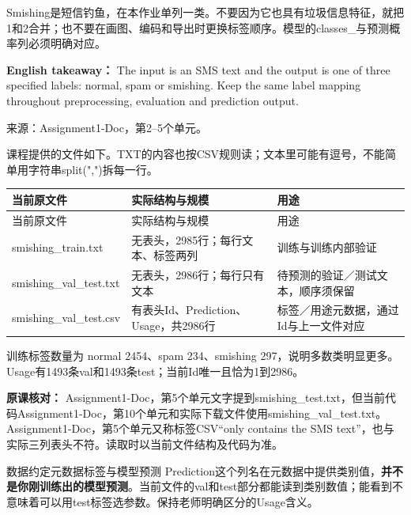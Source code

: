 Smishing是短信钓鱼，在本作业单列一类。不要因为它也具有垃圾信息特征，就把1和2合并；也不要在画图、编码和导出时更换标签顺序。模型的classes\_与预测概率列必须明确对应。


\textbf{English takeaway：} The input is an SMS text and the output is one of three specified labels: normal, spam or smishing. Keep the same label mapping throughout preprocessing, evaluation and prediction output.


来源：Assignment1-Doc，第2–5个单元。








课程提供的文件如下。TXT的内容也按CSV规则读；文本里可能有逗号，不能简单用字符串split(",")拆每一行。


\begingroup
\small\setlength{\tabcolsep}{3pt}
\renewcommand{\arraystretch}{1.22}
\begin{longtable}{@{}>{\raggedright\arraybackslash}p{}>{\raggedright\arraybackslash}p{}>{\raggedright\arraybackslash}p{}@{}}
\toprule
当前原文件 & 实际结构与规模 & 用途 \\
\midrule\endfirsthead
当前原文件 & 实际结构与规模 & 用途 \\
\midrule\endhead
\bottomrule\endfoot
smishing\_train.txt & 无表头，2985行；每行文本、标签两列 & 训练与训练内部验证 \\
smishing\_val\_test.txt & 无表头，2986行；每行只有文本 & 待预测的验证／测试文本，顺序须保留 \\
smishing\_val\_test.csv & 有表头Id、Prediction、Usage，共2986行 & 标签／用途元数据，通过Id与上一文件对应 \\
\end{longtable}
\endgroup


训练标签数量为 normal 2454、spam 234、smishing 297，说明多数类明显更多。Usage有1493条val和1493条test；当前Id唯一且恰为1到2986。


\textbf{原课核对：} Assignment1-Doc，第5个单元文字提到smishing\_test.txt，但当前代码Assignment1-Doc，第10个单元和实际下载文件使用smishing\_val\_test.txt。Assignment1-Doc，第5个单元又称标签CSV“only contains the SMS text”，也与实际三列表头不符。读取时以当前文件结构及代码为准。


\begin{StudyBlock}{数据约定}{元数据标签与模型预测}
Prediction这个列名在元数据中提供类别值，\textbf{并不是你刚训练出的模型预测}。当前文件的val和test部分都能读到类别数值；能看到不意味着可以用test标签选参数。保持老师明确区分的Usage含义。
\end{StudyBlock}


